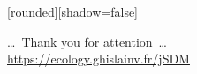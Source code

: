 
{
  [rounded][shadow=false]
  \begin{frame}[plain]
    \begin{block}{}
      \begin{center}
        \ldots~Thank you for attention~\ldots\\
        \url{https://ecology.ghislainv.fr/jSDM}
      \end{center}
    \end{block}
  \end{frame}
}